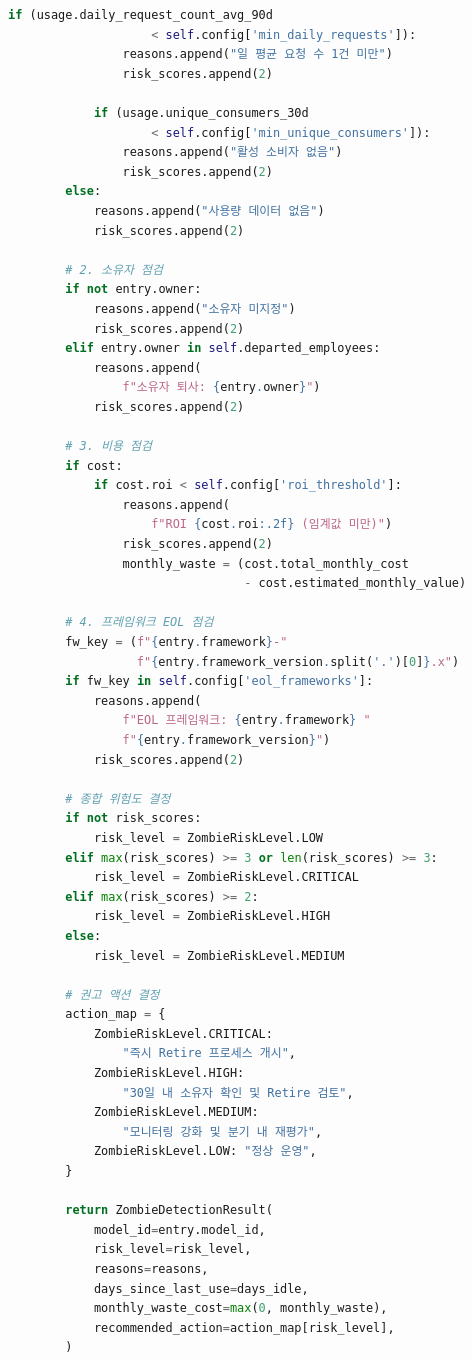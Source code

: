 \begin{lstlisting}[language=Python, caption={좀비 모델 탐지 자동화 시스템}, label={lst:zombie_detection}]
            if (usage.daily_request_count_avg_90d
                    < self.config['min_daily_requests']):
                reasons.append("일 평균 요청 수 1건 미만")
                risk_scores.append(2)

            if (usage.unique_consumers_30d
                    < self.config['min_unique_consumers']):
                reasons.append("활성 소비자 없음")
                risk_scores.append(2)
        else:
            reasons.append("사용량 데이터 없음")
            risk_scores.append(2)

        # 2. 소유자 점검
        if not entry.owner:
            reasons.append("소유자 미지정")
            risk_scores.append(2)
        elif entry.owner in self.departed_employees:
            reasons.append(
                f"소유자 퇴사: {entry.owner}")
            risk_scores.append(2)

        # 3. 비용 점검
        if cost:
            if cost.roi < self.config['roi_threshold']:
                reasons.append(
                    f"ROI {cost.roi:.2f} (임계값 미만)")
                risk_scores.append(2)
                monthly_waste = (cost.total_monthly_cost
                                 - cost.estimated_monthly_value)

        # 4. 프레임워크 EOL 점검
        fw_key = (f"{entry.framework}-"
                  f"{entry.framework_version.split('.')[0]}.x")
        if fw_key in self.config['eol_frameworks']:
            reasons.append(
                f"EOL 프레임워크: {entry.framework} "
                f"{entry.framework_version}")
            risk_scores.append(2)

        # 종합 위험도 결정
        if not risk_scores:
            risk_level = ZombieRiskLevel.LOW
        elif max(risk_scores) >= 3 or len(risk_scores) >= 3:
            risk_level = ZombieRiskLevel.CRITICAL
        elif max(risk_scores) >= 2:
            risk_level = ZombieRiskLevel.HIGH
        else:
            risk_level = ZombieRiskLevel.MEDIUM

        # 권고 액션 결정
        action_map = {
            ZombieRiskLevel.CRITICAL:
                "즉시 Retire 프로세스 개시",
            ZombieRiskLevel.HIGH:
                "30일 내 소유자 확인 및 Retire 검토",
            ZombieRiskLevel.MEDIUM:
                "모니터링 강화 및 분기 내 재평가",
            ZombieRiskLevel.LOW: "정상 운영",
        }

        return ZombieDetectionResult(
            model_id=entry.model_id,
            risk_level=risk_level,
            reasons=reasons,
            days_since_last_use=days_idle,
            monthly_waste_cost=max(0, monthly_waste),
            recommended_action=action_map[risk_level],
        )


\end{lstlisting}
